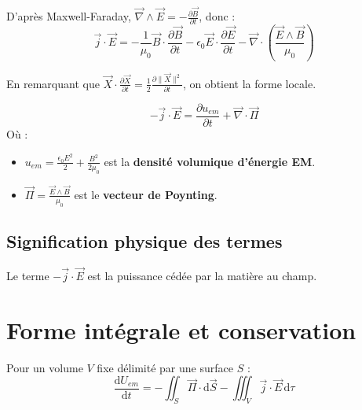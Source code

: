 \documentclass[french]{yLectureNote}
\renewcommand{\vec}{\overrightarrow}
\begin{document}
D'après Maxwell-Faraday, $\vec{\nabla} \wedge \vec{E} = -\frac{\partial \vec{B}}{\partial t}$, donc :
$$\vec{j} \cdot \vec{E} = -\frac{1}{\mu_0} \vec{B} \cdot \frac{\partial \vec{B}}{\partial t} - \epsilon_0 \vec{E} \cdot \frac{\partial \vec{E}}{\partial t} - \vec{\nabla} \cdot \left( \frac{\vec{E} \wedge \vec{B}}{\mu_0} \right)$$

En remarquant que $\vec{X} \cdot \frac{\partial \vec{X}}{\partial t} = \frac{1}{2} \frac{\partial \|\vec{X}\|^2}{\partial t}$, on obtient la forme locale.

\begin{theorem}
$$-\vec{j} \cdot \vec{E} = \frac{\partial u_{em}}{\partial t} + \vec{\nabla} \cdot \vec{\Pi}$$
Où :
\begin{itemize}
    \item $u_{em} = \frac{\epsilon_0 E^2}{2} + \frac{B^2}{2\mu_0}$ est la \textbf{densité volumique d'énergie EM}.
    \item $\vec{\Pi} = \frac{\vec{E} \wedge \vec{B}}{\mu_0}$ est le \textbf{vecteur de Poynting}.
\end{itemize}
\end{theorem}

\subsection{Signification physique des termes}

Le terme $-\vec{j} \cdot \vec{E}$ est la puissance cédée par la matière au champ.


\section{Forme intégrale et conservation}

\begin{proposition}
Pour un volume $V$ fixe délimité par une surface $S$ :
$$\frac{\mathrm{d}U_{em}}{\mathrm{d}t} = - \iint_S \vec{\Pi} \cdot \mathrm{d}\vec{S} - \iiint_V \vec{j} \cdot \vec{E} \, \mathrm{d}\tau$$
\end{proposition}
\end{document}
